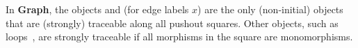 \begin{remark}
    \label{remark:traceability_graph}
    In \textbf{Graph}, the objects  and  (for edge labels $x$) are the only (non-initial) objects that are (strongly) traceable along all pushout squares. 
    Other objects, such as loops~, are strongly traceable if all morphisms in the square are monomorphisms.
\end{remark}

